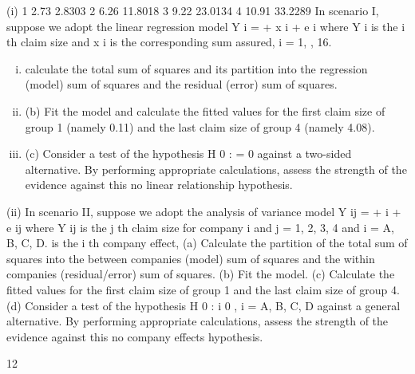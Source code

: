 \documentclass[a4paper,12pt]{article}
\begin{document}
\begin{enumerate}
(i)
1
2.73
2.8303
2
6.26
11.8018
3
9.22
23.0134
4
10.91
33.2289
In scenario I, suppose we adopt the linear regression model
Y i =
+ x i + e i
where Y i is the i th claim size and x i is the corresponding sum assured,
i = 1, , 16.
\begin{enumerate}[(i)]
\item calculate the total sum of squares and its partition into the regression
(model) sum of squares and the residual (error) sum of squares.
\item (b) Fit the model and calculate the fitted values for the first claim size of
group 1 (namely 0.11) and the last claim size of group 4 (namely 4.08).
\item (c) Consider a test of the hypothesis H 0 : = 0 against a two-sided
alternative. By performing appropriate calculations, assess the strength
of the evidence against this no linear relationship hypothesis.
\end{enumerate}
(ii)
In scenario II, suppose we adopt the analysis of variance model
Y ij =
+
i
+ e ij
where Y ij is the j th claim size for company i and
j = 1, 2, 3, 4 and i = A, B, C, D.
is the i th company effect,
(a) Calculate the partition of the total sum of squares into the between
companies (model) sum of squares and the within companies
(residual/error) sum of squares.
(b) Fit the model.
(c) Calculate the fitted values for the first claim size of group 1 and the
last claim size of group 4.
(d) Consider a test of the hypothesis H 0 : i 0 , i = A, B, C, D against a
general alternative. By performing appropriate calculations, assess the
strength of the evidence against this no company effects hypothesis.
\end{enumerate}
\newpage




12
\end{document}
